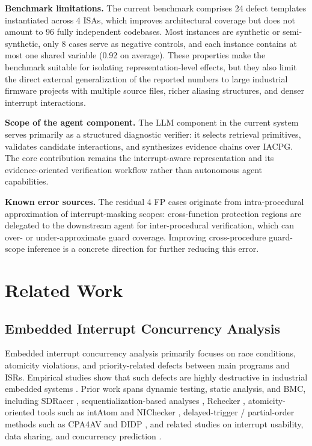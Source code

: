 \documentclass[conference]{IEEEtran}
\begin{document}
\textbf{Benchmark limitations.} The current benchmark comprises 24 defect templates instantiated across 4 ISAs, which improves architectural coverage but does not amount to 96 fully independent codebases. Most instances are synthetic or semi-synthetic, only 8 cases serve as negative controls, and each instance contains at most one shared variable (0.92 on average). These properties make the benchmark suitable for isolating representation-level effects, but they also limit the direct external generalization of the reported numbers to large industrial firmware projects with multiple source files, richer aliasing structures, and denser interrupt interactions.

\textbf{Scope of the agent component.} The LLM component in the current system serves primarily as a structured diagnostic verifier: it selects retrieval primitives, validates candidate interactions, and synthesizes evidence chains over IACPG. The core contribution remains the interrupt-aware representation and its evidence-oriented verification workflow rather than autonomous agent capabilities.

\textbf{Known error sources.} The residual 4 FP cases originate from intra-procedural approximation of interrupt-masking scopes: cross-function protection regions are delegated to the downstream agent for inter-procedural verification, which can over- or under-approximate guard coverage. Improving cross-procedure guard-scope inference is a concrete direction for further reducing this error.

\FloatBarrier
\section{Related Work}

\subsection{Embedded Interrupt Concurrency Analysis}

Embedded interrupt concurrency analysis primarily focuses on race conditions, atomicity violations, and priority-related defects between main programs and ISRs. Empirical studies show that such defects are highly destructive in industrial embedded systems \cite{li2023empirical}. Prior work spans dynamic testing, static analysis, and BMC, including SDRacer \cite{wang2017automatic}, sequentialization-based analyses \cite{wu2015numerical, wu2016static}, Rchecker \cite{feng2020rchecker}, atomicity-oriented tools such as intAtom and NIChecker \cite{li2022precise, zhang2025bounded}, delayed-trigger / partial-order methods such as CPA4AV and DIDP \cite{yu2023detecting, zhao2025formal}, and related studies on interrupt usability, data sharing, and concurrency prediction \cite{pan2019easy, wang2022specchecker, wang2025specchecker, yu2018conpredictor}.
\end{document}
